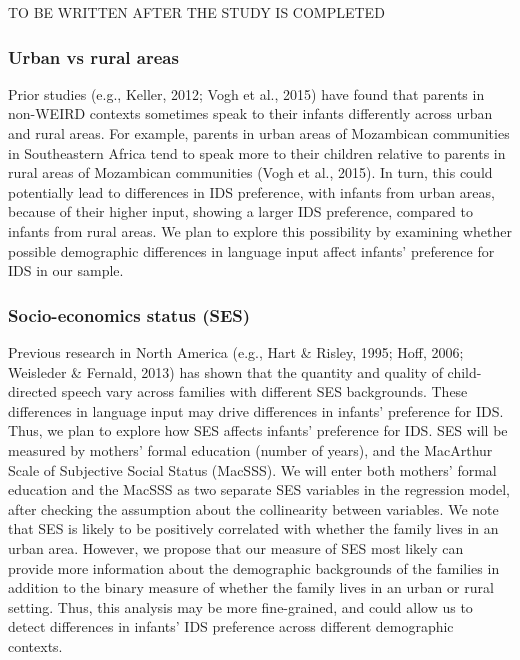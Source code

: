 \documentclass[
  ,man,floatsintext]{apa6}
\begin{document}
TO BE WRITTEN AFTER THE STUDY IS COMPLETED

\hypertarget{urban-vs-rural-areas}{%
\subsubsection{Urban vs rural areas}\label{urban-vs-rural-areas}}

Prior studies (e.g., Keller, 2012; Vogh et al., 2015) have found that parents in non-WEIRD contexts sometimes speak to their infants differently across urban and rural areas. For example, parents in urban areas of Mozambican communities in Southeastern Africa tend to speak more to their children relative to parents in rural areas of Mozambican communities (Vogh et al., 2015). In turn, this could potentially lead to differences in IDS preference, with infants from urban areas, because of their higher input, showing a larger IDS preference, compared to infants from rural areas. We plan to explore this possibility by examining whether possible demographic differences in language input affect infants' preference for IDS in our sample.

\hypertarget{socio-economics-status-ses}{%
\subsubsection{Socio-economics status (SES)}\label{socio-economics-status-ses}}

Previous research in North America (e.g., Hart \& Risley, 1995; Hoff, 2006; Weisleder \& Fernald, 2013) has shown that the quantity and quality of child-directed speech vary across families with different SES backgrounds. These differences in language input may drive differences in infants' preference for IDS. Thus, we plan to explore how SES affects infants' preference for IDS. SES will be measured by mothers' formal education (number of years), and the MacArthur Scale of Subjective Social Status (MacSSS). We will enter both mothers' formal education and the MacSSS as two separate SES variables in the regression model, after checking the assumption about the collinearity between variables. We note that SES is likely to be positively correlated with whether the family lives in an urban area. However, we propose that our measure of SES most likely can provide more information about the demographic backgrounds of the families in addition to the binary measure of whether the family lives in an urban or rural setting. Thus, this analysis may be more fine-grained, and could allow us to detect differences in infants' IDS preference across different demographic contexts.
\end{document}
